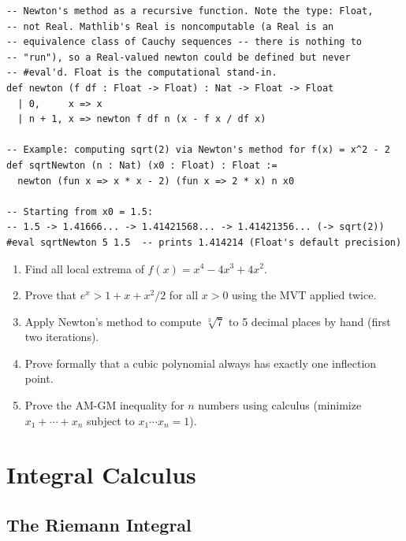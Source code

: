 \documentclass[12pt, openany]{book}
\theoremstyle{plain}
\theoremstyle{definition}
\theoremstyle{remark}
\begin{document}
\begin{leanbox}
\begin{lstlisting}
-- Newton's method as a recursive function. Note the type: Float,
-- not Real. Mathlib's Real is noncomputable (a Real is an
-- equivalence class of Cauchy sequences -- there is nothing to
-- "run"), so a Real-valued newton could be defined but never
-- #eval'd. Float is the computational stand-in.
def newton (f df : Float -> Float) : Nat -> Float -> Float
  | 0,     x => x
  | n + 1, x => newton f df n (x - f x / df x)

-- Example: computing sqrt(2) via Newton's method for f(x) = x^2 - 2
def sqrtNewton (n : Nat) (x0 : Float) : Float :=
  newton (fun x => x * x - 2) (fun x => 2 * x) n x0

-- Starting from x0 = 1.5:
-- 1.5 -> 1.41666... -> 1.41421568... -> 1.41421356... (-> sqrt(2))
#eval sqrtNewton 5 1.5  -- prints 1.414214 (Float's default precision)
\end{lstlisting}
\end{leanbox}
\color{black}

\begin{exbox}
\begin{enumerate}
  \item Find all local extrema of $f(x) = x^4 - 4x^3 + 4x^2$.
  \item Prove that $e^x > 1 + x + x^2/2$ for all $x > 0$ using the MVT applied twice.
  \item Apply Newton's method to compute $\sqrt[3]{7}$ to 5 decimal places by hand (first two iterations).
  \item Prove formally that a cubic polynomial always has exactly one inflection point.
  \item Prove the AM-GM inequality for $n$ numbers using calculus (minimize $x_1 + \cdots + x_n$ subject to $x_1 \cdots x_n = 1$).
\end{enumerate}
\end{exbox}
\color{black}

\part{Integral Calculus}
\color{black}

\chapter{The Riemann Integral}
\color{black}
\end{document}
